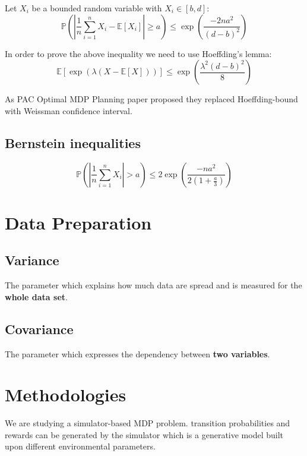 \documentclass[a4paper,12pt]{article}
\begin{document}
Let $X_i$ be a bounded random variable with $X_i \in [b, d]$:
\begin{equation}
    \mathbb {P} \left( \left| \frac{1}{n} \sum_{i=1}^{n} X_i - \mathbb{E}[X_i] \right| \geq a \right) \leq { \exp \left( \frac{-2 n a ^ {2} }{ \left(d-b \right) ^ 2} \right) }
\end{equation}

In order to prove the above inequality we need to use Hoeffding's lemma:
\begin{equation}
    \mathbb {E} \left[ \exp \left( {\lambda ( X - \mathbb {E}[X] )} \right)  \right] \leq \exp \left( \frac{\lambda ^ 2 (d-b)^2}{8} \right)
\end{equation}

As PAC Optimal MDP Planning paper \cite{AlkaeeTaleghan2015a} proposed they replaced Hoeffding-bound with Weissman confidence interval.

\subsection{Bernstein inequalities}
\begin{equation}
    \mathbb { P } \left( \left| \frac { 1 } { n } \sum _ { i = 1 } ^ { n } X _ { i } \right| > a \right) \leq 2 \exp \left( \frac {- n a ^ {2} } { 2 \left( 1 + \frac {a} {3} \right) } \right)
\end{equation}

\section{Data Preparation}

\subsection{Variance}
The parameter which explains how much data are spread and is measured for the \textbf{whole data set}.

\subsection{Covariance}
The parameter which expresses the dependency between \textbf{two variables}.

\section{Methodologies}
We are studying a simulator-based MDP problem. transition probabilities and rewards can be generated by the simulator which is a generative model built upon different environmental parameters.
\end{document}
